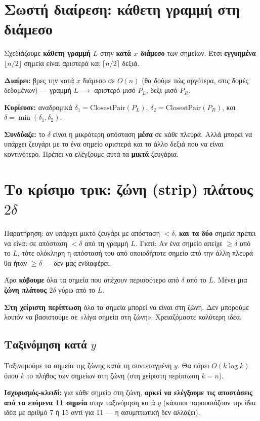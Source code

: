 \documentclass[11pt,a4paper]{article}
\begin{document}
\section{Σωστή διαίρεση: κάθετη γραμμή στη διάμεσο}

Σχεδιάζουμε \textbf{κάθετη γραμμή} $L$ στην \textbf{κατά $x$ διάμεσο} των
σημείων. Έτσι \textbf{εγγυημένα} $\lfloor n/2 \rfloor$ σημεία είναι αριστερά και
$\lceil n/2 \rceil$ δεξιά.

\textbf{Διαίρει:} βρες την κατά $x$ διάμεσο σε $O(n)$ (θα δούμε πώς αργότερα,
στις δομές δεδομένων) --- γραμμή $L$ $\to$ αριστερό μισό $P_L$, δεξί μισό $P_R$.

\textbf{Κυρίευσε:} αναδρομικά $\delta_1 = \text{ClosestPair}(P_L)$,
$\delta_2 = \text{ClosestPair}(P_R)$, και $\delta = \min(\delta_1, \delta_2)$.

\textbf{Συνδύαζε:} το $\delta$ είναι η μικρότερη απόσταση \textbf{μέσα} σε κάθε
πλευρά. Αλλά μπορεί να υπάρχει ζευγάρι με το ένα σημείο αριστερά και το άλλο
δεξιά που να είναι κοντινότερο. Πρέπει να ελέγξουμε αυτά τα \textbf{μικτά}
ζευγάρια.

\section{Το κρίσιμο τρικ: ζώνη (strip) πλάτους $2\delta$}

Παρατήρηση: αν υπάρχει μικτό ζευγάρι με απόσταση $< \delta$, \textbf{και τα δύο}
σημεία πρέπει να είναι σε απόσταση $< \delta$ από τη γραμμή $L$. Γιατί; Αν ένα
σημείο απείχε $\ge \delta$ από το $L$, τότε ολόκληρη η απόστασή του από
οποιοδήποτε σημείο από την άλλη πλευρά θα ήταν $\ge \delta$ --- δεν μας
ενδιαφέρει.

Άρα \textbf{κόβουμε} όλα τα σημεία που απέχουν περισσότερο από $\delta$ από το
$L$. Μένει μια \textbf{ζώνη πλάτους $2\delta$} γύρω από το $L$.

\textbf{Στη χείριστη περίπτωση} όλα τα σημεία μπορεί να είναι στη ζώνη. Δεν
μπορούμε λοιπόν να βασιστούμε σε «λίγα σημεία στη ζώνη». Χρειαζόμαστε καλύτερη
ιδέα.

\subsection{Ταξινόμηση κατά $y$}

Ταξινομούμε τα σημεία της ζώνης κατά τη συντεταγμένη $y$. Θα πάρει $O(k \log k)$
όπου $k$ το πλήθος των σημείων στη ζώνη (στη χείριστη περίπτωση $k = n$).

\textbf{Ισχυρισμός-κλειδί:} για κάθε σημείο στη ζώνη, \textbf{αρκεί να ελέγξουμε
τις αποστάσεις από τα επόμενα 11 σημεία} στην ταξινόμηση κατά $y$ (κάποιοι
παρουσιάζουν την ίδια ιδέα με αριθμό 7 ή 15 αντί για 11 --- η ασυμπτωτική δεν
αλλάζει).
\end{document}
